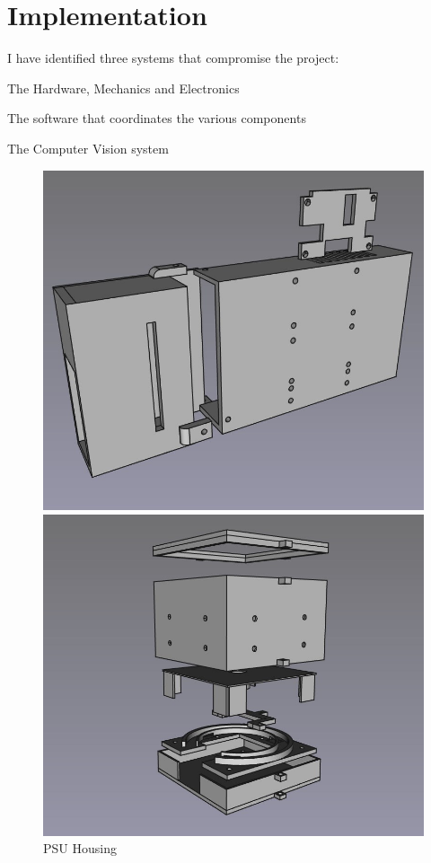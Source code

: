 \section{Implementation}
I have identified three systems that compromise the project:
\begin{mylist}
  \item The Hardware, Mechanics and Electronics
  \item The software that coordinates the various components
  \item The Computer Vision system
\end{mylist}


\begin{figure}
  \begin{minipage}[t]{0.32\textwidth}
    \centering
    \includegraphics[width=\textwidth]{imgs/freecad/psu_mount.jpg}
    \caption{PSU Housing}
  \end{minipage}
  \hfill
  \begin{minipage}[t]{0.32\textwidth}
    \centering
    \includegraphics[width=\textwidth]{imgs/freecad/camera_case.jpg}

\end{minipage}
\end{figure}
